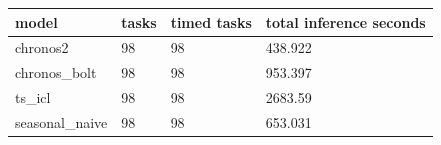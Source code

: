 \begin{tabular}{llll}
\toprule
model & tasks & timed tasks & total inference seconds \\
\midrule
chronos2 & 98 & 98 & 438.922 \\
chronos\_bolt & 98 & 98 & 953.397 \\
ts\_icl & 98 & 98 & 2683.59 \\
seasonal\_naive & 98 & 98 & 653.031 \\
\bottomrule
\end{tabular}
